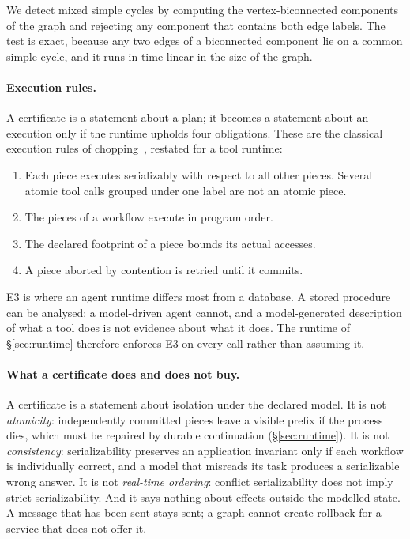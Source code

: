 We detect mixed simple cycles by computing the vertex-biconnected components
of the graph and rejecting any component that contains both edge labels. The
test is exact, because any two edges of a biconnected component lie on a
common simple cycle, and it runs in time linear in the size of the graph.

\paragraph{Execution rules.}
A certificate is a statement about a plan; it becomes a statement about an
execution only if the runtime upholds four obligations. These are the
classical execution rules of chopping~\cite{shasha1995chopping}, restated for
a tool runtime:
\begin{enumerate}
\item[\textbf{E1}] Each piece executes serializably with respect to all other
  pieces. Several atomic tool calls grouped under one label are not an atomic
  piece.
\item[\textbf{E2}] The pieces of a workflow execute in program order.
\item[\textbf{E3}] The declared footprint of a piece bounds its actual
  accesses.
\item[\textbf{E4}] A piece aborted by contention is retried until it commits.
\end{enumerate}
E3 is where an agent runtime differs most from a database. A stored procedure
can be analysed; a model-driven agent cannot, and a model-generated
description of what a tool does is not evidence about what it does. The
runtime of \S\ref{sec:runtime} therefore enforces E3 on every call rather than
assuming it.

\paragraph{What a certificate does and does not buy.}
A certificate is a statement about isolation under the declared model.
It is not \emph{atomicity}: independently committed pieces leave a visible
prefix if the process dies, which must be repaired by durable continuation
(\S\ref{sec:runtime}). It is not \emph{consistency}: serializability preserves
an application invariant only if each workflow is individually correct, and a
model that misreads its task produces a serializable wrong answer. It is not
\emph{real-time ordering}: conflict serializability does not imply strict
serializability. And it says nothing about effects outside the modelled
state. A message that has been sent stays sent; a graph cannot create rollback
for a service that does not offer it.
